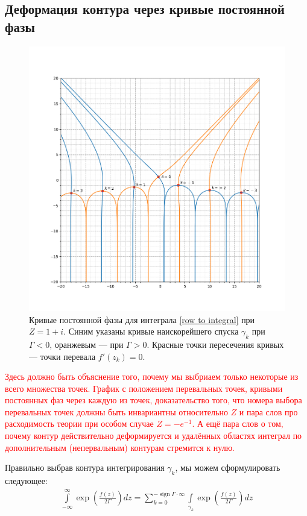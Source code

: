 \documentclass[a4paper, 12pt]{article}
\DeclareMathOperator*{\sign}{sign}
\newenvironment{eqw}{\begin{equation} \begin{aligned}}   
    {\end{aligned}    \end{equation}}
\begin{document}
\subsection*{Деформация контура через кривые постоянной фазы}
\begin{figure}
    \includegraphics[width=\textwidth]{constant_phase_curve.png}
    \caption{Кривые постоянной фазы для интеграла \ref{row to integral} при $Z=1+i$. Синим указаны кривые наискорейшего спуска $\gamma_k$ при $\Gamma < 0$, оранжевым --- при $\Gamma > 0$. Красные точки пересечения кривых --- точки перевала $f'(z_k)=0$.}
\end{figure}
\textcolor{red}{Здесь должно быть объяснение того, почему мы выбриаем только некоторые из всего множества точек. График с положением перевальных точек, кривыми постоянных фаз через каждую из точек, доказательство того, что номера выбора перевальных точек должны быть инвариантны относительно $Z$ и пара слов про расходимость теории при особом случае $Z=-e^{-1}$. А ещё пара слов о том, почему контур действительно деформируется и удалённых областях интеграл по дополнительным (непервальным) контурам стремится к нулю.}

Правильно выбрав контура интегрирования $\gamma_k$, мы можем сформулировать следующее:
\begin{eqw}\label{contour deformation}
    \int\limits_{-\infty}^{\infty}\exp\left(\frac{f(z)}{2\Gamma}\right) dz = \sum\limits_{k=0}^{-\sign\Gamma \cdot \infty}
    \int\limits_{\gamma_k} \exp\left(\frac{f(z)}{2\Gamma}\right) dz
\end{eqw}
\end{document}
